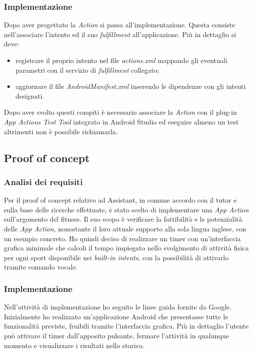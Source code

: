 		\subsubsection{Implementazione}
		Dopo aver progettato la \emph{Action} si passa all'implementazione. Questa consiste nell'associare l'intento ed il suo \emph{fulfillment} all'applicazione. Più in dettaglio si deve:
		\begin{itemize}
			\item registrare il proprio intento nel file \emph{actions.xml} mappando gli eventuali parametri con il servizio di \emph{fulfillment} collegato;
			\item aggiornare il file \emph{AndroidManifest.xml} inserendo le dipendenze con gli intenti designati.
		\end{itemize}
		Dopo aver svolto questi compiti è necessario associare la \emph{Action} con il plug-in \emph{App Actions Test Tool} integrato in Android Studio ed eseguire almeno un test altrimenti non è possibile richiamarla.
	\subsection{Proof of concept}
		\subsubsection{Analisi dei requisiti}
		Per il proof of concept relativo ad Assistant, in comune accordo con il tutor e sulla base delle ricerche effettuate, è stato scelto di implementare una \emph{App Action} sull'argomento del fitness. Il suo scopo è verificare la fattibilità e le potenzialità delle \emph{App Action}, nonostante il loro attuale supporto alla sola lingua inglese, con un esempio concreto.
		Ho quindi deciso di realizzare un timer con un'interfaccia grafica minimale che calcoli il tempo impiegato nello svolgimento di attività fisica per ogni sport disponibile nei \emph{built-in intents}, con la possibilità di attivarlo tramite comando vocale.
		\subsubsection{Implementazione}	\mbox{}
		Nell'attività di implementazione ho seguito le linee guida fornite da Google. Inizialmente ho realizzato un'applicazione Android che presentasse tutte le funzionalità previste, fruibili tramite l'interfaccia grafica. Più in dettaglio l'utente può attivare il timer dall'apposito pulsante, fermare l'attività in qualunque momento e visualizzare i risultati nello storico. 
		
